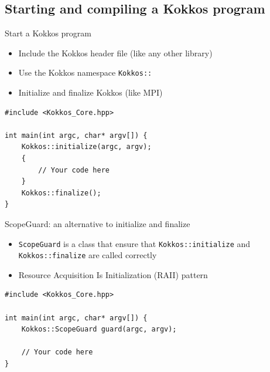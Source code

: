 \documentclass[aspectratio=169]{beamer}
\begin{document}

\subsection[Starting a Kokkos program]{Starting and compiling a Kokkos program}


\begin{frame}[fragile]{Start a Kokkos program}
    \begin{itemize}
        \item Include the Kokkos header file (like any other library)
        \item Use the Kokkos namespace \texttt{Kokkos::}
        \item Initialize and finalize Kokkos (like MPI)
    \end{itemize}
    \begin{verbatim}
#include <Kokkos_Core.hpp>

int main(int argc, char* argv[]) {
    Kokkos::initialize(argc, argv);
    {
        // Your code here
    }
    Kokkos::finalize();
}
    \end{verbatim}
\end{frame}


\begin{frame}[fragile]{ScopeGuard: an alternative to initialize and finalize}
    \begin{itemize}
        \item \texttt{ScopeGuard} is a class that ensure that \texttt{Kokkos::initialize} and \texttt{Kokkos::finalize} are called correctly
        \item Resource Acquisition Is Initialization (RAII) pattern
    \end{itemize}
    \begin{verbatim}
#include <Kokkos_Core.hpp>

int main(int argc, char* argv[]) {
    Kokkos::ScopeGuard guard(argc, argv);

    // Your code here
}
    \end{verbatim}
\end{frame}

\end{document}
